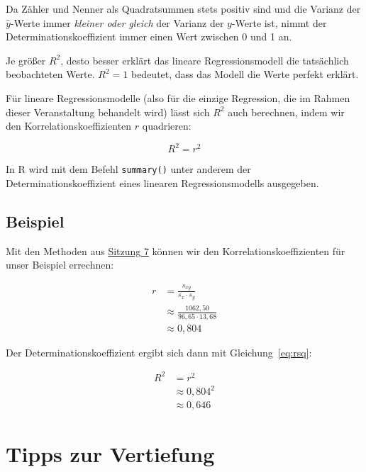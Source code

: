 \documentclass[
  11pt,
  ngerman,
  a4paper,
]{report}
\newenvironment{rtip}{
  \medskip
  \begin{tcolorbox}[colframe=purple,colback=light_gray,title=Softwarehinweis]
}{
  \end{tcolorbox}
  \medskip
}
\begin{document}
Da Zähler und Nenner als Quadratsummen stets positiv sind und die Varianz der \(\hat{y}\)-Werte immer \emph{kleiner oder gleich} der Varianz der \(y\)-Werte ist, nimmt der Determinationskoeffizient immer einen Wert zwischen 0 und 1 an.

Je größer \(R^2\), desto besser erklärt das lineare Regressionsmodell die tatsächlich beobachteten Werte. \(R^2=1\) bedeutet, dass das Modell die Werte perfekt erklärt.

Für lineare Regressionsmodelle (also für die einzige Regression, die im Rahmen dieser Veranstaltung behandelt wird) lässt sich \(R^2\) auch berechnen, indem wir den Korrelationskoeffizienten \(r\) quadrieren:

\[
R^2=r^2
\label{eq:rsq}
\]

\begin{rtip}
In R wird mit dem Befehl \verb|summary()| unter anderem der Determinationskoeffizient eines linearen Regressionsmodells ausgegeben.
\end{rtip}

\hypertarget{beispiel-28}{%
\subsection{Beispiel}\label{beispiel-28}}

Mit den Methoden aus \protect\hyperlink{korrelationskoeffizient}{Sitzung 7} können wir den Korrelationskoeffizienten für unser Beispiel errechnen:

\[
\begin{aligned}
r&=\frac{s_{xy}}{s_x\cdot s_y}\\
&\approx\frac{1062{,}50}{96{,}65\cdot13,68}\\
&\approx0{,}804
\end{aligned}
\]

Der Determinationskoeffizient ergibt sich dann mit Gleichung~\eqref{eq:rsq}:

\[
\begin{aligned}
R^2&=r^2\\
&\approx 0{,}804^2\\
&\approx 0{,}646
\end{aligned}
\]

\hypertarget{tipps-zur-vertiefung-7}{%
\section*{Tipps zur Vertiefung}\label{tipps-zur-vertiefung-7}}
\end{document}
